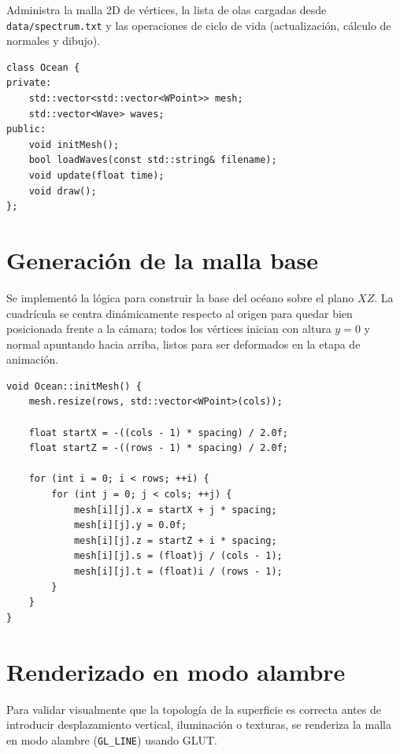 \documentclass[11pt]{article}
\begin{document}
Administra la malla 2D de vértices, la lista de olas cargadas desde
\texttt{data/spectrum.txt} y las operaciones de ciclo de vida (actualización,
cálculo de normales y dibujo).

\begin{lstlisting}
class Ocean {
private:
    std::vector<std::vector<WPoint>> mesh;
    std::vector<Wave> waves;
public:
    void initMesh();
    bool loadWaves(const std::string& filename);
    void update(float time);
    void draw();
};
\end{lstlisting}

\section{Generación de la malla base}

Se implementó la lógica para construir la base del océano sobre el plano $XZ$.
La cuadrícula se centra dinámicamente respecto al origen para quedar bien
posicionada frente a la cámara; todos los vértices inician con altura $y=0$ y
normal apuntando hacia arriba, listos para ser deformados en la etapa de
animación.

\begin{lstlisting}
void Ocean::initMesh() {
    mesh.resize(rows, std::vector<WPoint>(cols));

    float startX = -((cols - 1) * spacing) / 2.0f;
    float startZ = -((rows - 1) * spacing) / 2.0f;

    for (int i = 0; i < rows; ++i) {
        for (int j = 0; j < cols; ++j) {
            mesh[i][j].x = startX + j * spacing;
            mesh[i][j].y = 0.0f;
            mesh[i][j].z = startZ + i * spacing;
            mesh[i][j].s = (float)j / (cols - 1);
            mesh[i][j].t = (float)i / (rows - 1);
        }
    }
}
\end{lstlisting}

\section{Renderizado en modo alambre}

Para validar visualmente que la topología de la superficie es correcta antes de
introducir desplazamiento vertical, iluminación o texturas, se renderiza la malla
en modo alambre (\texttt{GL\_LINE}) usando GLUT.
\end{document}
